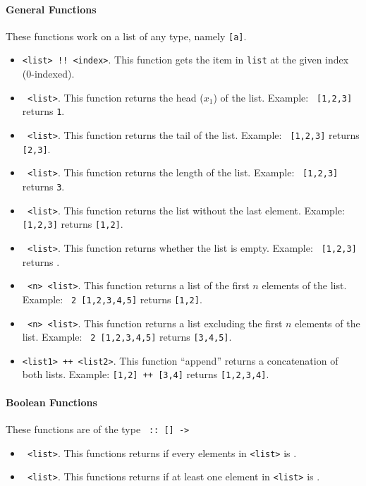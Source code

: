 \paragraph{General Functions} These functions work on a list of any type, namely \texttt{[a]}.
\begin{itemize}
  \item \texttt{<list> !! <index>}. This function gets the item in \texttt{list} at the given index (0-indexed).
  \item \texttt{ <list>}. This function returns the head ($x_1$) of the list. Example: \texttt{ [1,2,3]} returns \texttt{1}.
  \item \texttt{ <list>}. This function returns the tail of the list. Example: \texttt{ [1,2,3]} returns \texttt{[2,3]}.
  \item \texttt{ <list>}. This function returns the length of the list. Example: \texttt{ [1,2,3]} returns \texttt{3}.
  \item \texttt{ <list>}. This function returns the list without the last element. Example: \texttt{ [1,2,3]} returns \texttt{[1,2]}.
  \item \texttt{ <list>}. This function returns whether the list is empty. Example: \texttt{ [1,2,3]} returns \texttt{}.
  \item \texttt{ <n> <list>}. This function returns a list of the first $n$ elements of the list. Example: \texttt{ 2 [1,2,3,4,5]} returns \texttt{[1,2]}.
  \item \texttt{ <n> <list>}. This function returns a list excluding the first $n$ elements of the list. Example: \texttt{ 2 [1,2,3,4,5]} returns \texttt{[3,4,5]}.
  \item \texttt{<list1> ++ <list2>}. This function ``append'' returns a concatenation of both lists. Example: \texttt{[1,2] ++ [3,4]} returns \texttt{[1,2,3,4]}.
\end{itemize}

\paragraph{Boolean Functions} These functions are of the type \texttt{ :: [] -> }
\begin{itemize}
  \item \texttt{ <list>}. This functions returns \texttt{} if every elements in \texttt{<list>} is \texttt{}.
  \item \texttt{ <list>}. This functions returns \texttt{} if at least one element in \texttt{<list>} is \texttt{}.
\end{itemize}

